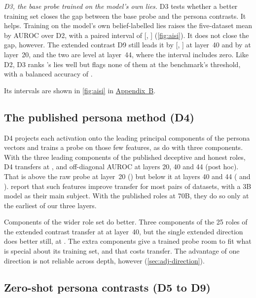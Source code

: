 \emph{D3, the base probe trained on the model's own lies.} D3 tests whether a better training set
closes the gap between the base probe and the persona contrasts. It helps. Training on the model's
own belief-labelled lies raises the five-dataset mean by  AUROC over D2, with
a paired interval of [, ] (\cref{fig:aisi}). It does
not close the gap, however. The extended contrast D9 still leads it by 
[, ] at layer~40 and by  at layer~20,
and the two are level at layer~44, where the interval includes zero. Like D2, D3 ranks \hpkr's lies
well but flags none of them at the benchmark's threshold, with a balanced accuracy of
.

Its intervals are shown in \cref{fig:aisi} in \hyperref[app:supplementary]{Appendix~B}.

\subsection{The published persona method (D4)}
\label{sec:d4}

D4 projects each activation onto the leading principal components of the persona vectors and
trains a probe on those few features, as \textcite{mahadik2026persona} do with three components.
With the three leading components of the published deceptive and honest roles, D4 transfers at
,  and  off-diagonal AUROC at layers 20, 40
and 44 (post hoc). That is above the raw probe at layer~20 () but below it at layers
40 and 44 ( and ). \textcite{mahadik2026persona} report that such
features improve transfer for most pairs of datasets, with a 3B model as their main subject. With the
published roles at 70B, they do so only at the earliest of our three layers.

Components of the wider role set do better. Three components of the 25 roles of the extended
contrast transfer at  at layer~40, but the single extended direction does better
still, at . The extra components give a trained probe room to fit what is special about
its training set, and that costs transfer. The advantage of one direction is not reliable across
depth, however (\cref{sec:adj-direction}).

\subsection{Zero-shot persona contrasts (D5 to D9)}
\label{sec:zeroshot}

